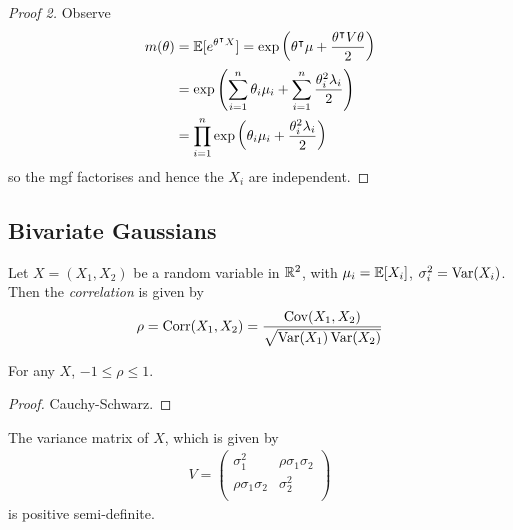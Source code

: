 \documentclass{../template/note}
\begin{document}
    \begin{proof}[Proof 2]
        Observe
        \begin{align*}
            m(\theta) &= \mathbb E[e^{\theta^\intercal X}] = \exp\left(\theta^\intercal \mu + \frac{\theta^\intercal V \theta} 2\right) \\
            &= \exp\left(\sum_{i=1}^n \theta_i \mu_i + \sum_{i=1}^n \frac{\theta_i^2 \lambda_i}2\right) \\
            &= \prod_{i=1}^n \exp\left(\theta_i \mu_i + \frac{\theta_i^2 \lambda_i} 2\right)
        \end{align*}
        so the mgf factorises and hence the \(X_i\) are independent.
    \end{proof}
    
    \subsection{Bivariate Gaussians}

    \begin{definition}[Correlation]
        Let \(X = (X_1, X_2)\) be a random variable in \(\mathbb R^2\), with \(\mu_i = \mathbb E[X_i]\), \(\sigma^2_i = \operatorname{Var}(X_i)\). Then the \emph{correlation} is given by
        \begin{align*}
            \rho = \operatorname{Corr}(X_1, X_2) = \frac{\operatorname{Cov}(X_1, X_2)}{\sqrt{\operatorname{Var}(X_1)\operatorname{Var}(X_2)}}
        \end{align*}
    \end{definition}
    
    \begin{lemma}
        For any \(X\), \(-1 \leq \rho \leq 1\).
    \end{lemma}

    \begin{proof}
        Cauchy-Schwarz.
    \end{proof}

    \begin{lemma}
        The variance matrix of \(X\), which is given by
        \begin{align*}
            V = \begin{pmatrix}
                \sigma_1^2 & \rho\sigma_1\sigma_2 \\
                \rho\sigma_1\sigma_2 & \sigma_2^2 \\
            \end{pmatrix}
        \end{align*}
        is positive semi-definite.        
    \end{lemma}
    
\end{document}
